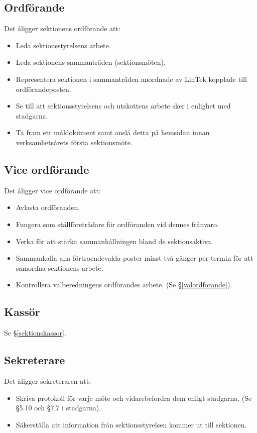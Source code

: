 \documentclass{datateknologsektionen-document}
\begin{document}
\subsection{Ordförande}
\label{ordforande}
Det åligger sektionens ordförande att:
\begin{itemize}
  \item Leda sektionsstyrelsens arbete.
  \item Leda sektionens sammanträden (sektionsmöten).
  \item Representera sektionen i sammanträden anordnade av LinTek kopplade till ordförandeposten.
  \item Se till att sektionsstyrelsens och utskottens arbete sker i enlighet med stadgarna.
  \item Ta fram ett måldokument samt anslå detta på hemsidan innan verksamhetsårets första sektionsmöte.
\end{itemize}

\subsection{Vice ordförande}
\label{viceordforande}
Det åligger vice ordförande att:
\begin{itemize}
  \item Avlasta ordföranden.
  \item Fungera som ställföreträdare för ordföranden vid dennes frånvaro.
  \item Verka för att stärka sammanhållningen bland de sektionsaktiva.
  \item Sammankalla alla förtroendevalda poster minst två gånger per termin för att samordna sektionens arbete.
  \item Kontrollera valberedningens ordförandes arbete. (Se \S \ref{valordforande}).
\end{itemize}

\subsection{Kassör}
\label{styrelsekassor}
Se \S \ref{sektionskassor}.

\subsection{Sekreterare}
\label{sekreterare}
Det åligger sekreteraren att:
\begin{itemize}
  \item Skriva protokoll för varje möte och vidarebefordra dem enligt stadgarna. (Se \S 5.10 och \S 7.7 i stadgarna).
  \item Säkerställa att information från sektionsstyrelsen kommer ut till sektionen.
\end{itemize}
\end{document}

